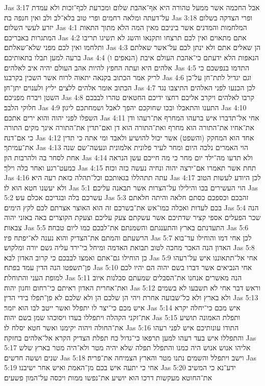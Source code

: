 Jas 3:17  אבל החכמה אשר ממעל טהורה היא אף־אהבת שלום ומכרעת לכף־זכות ולא עמדת על־דעתה ומלאה רחמים ופרי טוב בלא־לב ולב ואין חנפה בה׃
Jas 3:18  ופרי הצדקה בשלום יזרע לעשי השלום׃
Jas 4:1  המלחמות והמדנים אשר ביניכם מאין המה הלא מתוך התאות המתגרות באבריכם׃
Jas 4:2  אתם מתאוים ואין לכם תרצחו ותקנאו והשג לא תשיגו תריבו ותלחמו ואין לכם מפני שלא־שאלתם׃
Jas 4:3  הן שאלים אתם ולא ינתן לכם על־אשר שאלתם ברעה למען תבלו בתאותיכם׃
Jas 4:4  (הנאפים ו) הנאפות הלא ידעתם כי־אהבת העולם איבת אלהים היא ועתה החפץ להיות אהב העולם יהיה איב לאלהים׃
Jas 4:5  התדמו בנפשכם כי לריק אמר הכתוב בקנאה יתאוה לרוח אשר השכין בקרבנו׃
Jas 4:6  וגם יגדיל לתת־חן על־כן הכתוב אומר אלהים ללצים יליץ ולענוים יתן־חן׃
Jas 4:7  לכן הכנעו לפני האלהים התיצבו נגד השטן ויברח מפניכם׃
Jas 4:8  קרבו לאלהים ויקרב אליכם רחצו ידיכם החטאים טהרו לבבכם חלוקי הלבב׃
Jas 4:9  התענו והתאבלו ובכו שחוקכם יהפך לאבל ושמחתכם ליגון׃
Jas 4:10  השפלו לפני יהוה והוא ירים אתכם׃
Jas 4:11  אחי אל־תדברו איש ברעהו המחרף את־רעהו ודן את־אחיו את־התורה הוא מחרף ואת־התורה הוא דן ואם־תדין את־התורה אינך מקים התורה כי אם־דנה׃
Jas 4:12  אחד הוא המחקק (והשפט) אשר יכול להושיע ולאבד ומי אתה כי תדין את־עמיתך׃
Jas 4:13  הוי האמרים נלכה היום ומחר לעיר פלונית אלמונית ונעשה־שם שנה אחת לסחר בה ולהרבות הון׃
Jas 4:14  ולא תדעו מה־ילד יום מחר כי מה חייכם עשן הנראה כמעט־רגע ואחר כלה וילך׃
Jas 4:15  תחת אשר תאמרו אם־ירצה יהוה ונחיה נעשה כזה וכזה׃
Jas 4:16  עתה תתהללו בגאותכם וכל־תהלה כזאת רעה היא׃
Jas 4:17  לכן היודע לעשות הטוב ולא יעשנו חטא הוא לו׃
Jas 5:1  הוי העשירים בכו והילילו על־הצרות אשר תבאנה עליכם׃
Jas 5:2  עשרכם בלה ובגדיכם אכלם עש׃
Jas 5:3  זהבכם וכספכם כסתם חלאה והיתה חלאתם בכם לעדות ואכלה כמו־אש את־בשרכם זה הוא האוצר אצרתם לכם לקץ הימים׃
Jas 5:4  הנה שכר הפעלים אספי קציר שדתיכם אשר עשקתם צעק עליכם וצעקת הקוצרים באה באזני יהוה צבאות׃
Jas 5:5  התעדנתם בארץ והתענגתם והשמנתם את־לבכם כמו ליום טבחה׃
Jas 5:6  הרשעתם והמתם את־הצדיק והוא נענה לא־יפתח פיו׃
Jas 5:7  לכן אחי דמו והוחילו עד־בוא האדון הנה האכר מחכה לטוב תבואת האדמה ומיחל כי־ירד עליה גשם יורה ומלקוש׃
Jas 5:8  כן הוחילו גם־אתם ואמצו לבבכם כי קרוב האדון לבא׃
Jas 5:9  אחי אל־תתאוננו איש על־רעהו פן־תשפטו הנה הדין עמד בפתח׃
Jas 5:10  אחי הנביאים אשר דברו בשם יהוה הם יהיו לכם למופת העני והתוחלת׃
Jas 5:11  הנה מאשרים אנחנו את־הסבלים שמעתם סבלנות איוב ואת־אחרית האדון ראיתם כי־רחום וחנון יהוה׃
Jas 5:12  וראש דבר אחי לא תשבעו לא בשמים ולא בארץ ולא כל־שבועה אחרת ויהי הן שלכם הן ולא שלכם לא פן־תפלו בידי הדין׃
Jas 5:13  איש מכם כי־יצר לו יתפלל ואשר ייטב לבו הוא יזמר׃
Jas 5:14  איש מכם כי־יחלה יקרא את־זקני הקהלה ויתפללו בעדו ויסוכהו שמן בשם יהוה׃
Jas 5:15  ותפלת האמונה תושיע את־החולה ויהוה יקימנו ואשר חטא יסלח לו׃
Jas 5:16  התודו עונותיכם איש לפני רעהו והתפללו איש בעד רעהו למען תרפאו כי־גדול כח תפלת הצדיק הקרא אל־אלהים בחזקה׃
Jas 5:17  אליהו אנוש אנוש היה כמנו והתפלל תפלה שלא יהיה מטר ולא־היה מטר בארץ שלש שנים וששה חדשים׃
Jas 5:18  וישב ויתפלל והשמים נתנו מטר והארץ הצמיחה את־פריה׃
Jas 5:19  אחי כי יתעה איש בכם מן־האמת ואיש אחר ישיבנו׃
Jas 5:20  ידע־נא כי המשיב את־החוטא מעקשות דרכו הוא יושיע את־נפשו ממות ויכסה על־המון פשעים׃


